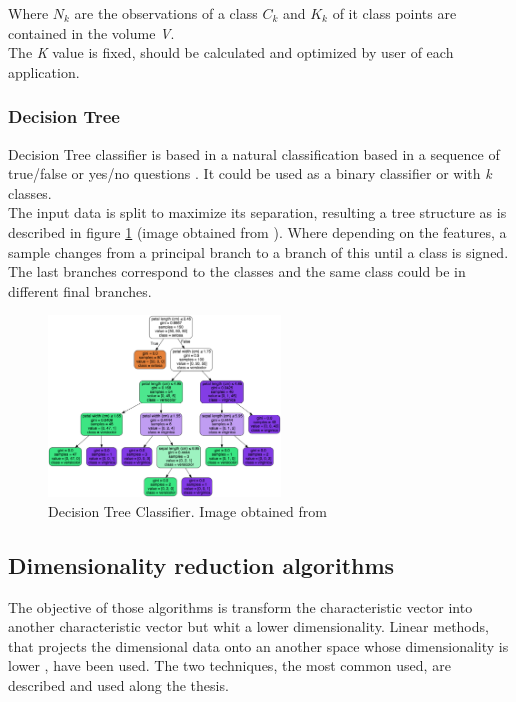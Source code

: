 Where $N_k$ are the observations of a class $C_k$ and $K_k$ of it class points are contained in the volume \textit{V}.\\

The \textit{K} value is fixed, should be calculated and optimized by user of each application.\\

\subsubsection{Decision Tree}
Decision Tree classifier is based in a natural classification based in a sequence of true/false or yes/no questions \cite{Duda}. It could be used as a binary classifier or with \textit{k} classes. \\

The input data is split to maximize its separation, resulting a tree structure \cite{ClassifiersReview} as is described in figure \ref{fig:Tree} (image obtained from \cite{Treeimage}). Where depending on the features, a sample changes from a principal branch to a branch of this until a class is signed. The last branches correspond to the classes and the same class could be in different final branches. \\

\begin{figure}[htb]
\centering
\includegraphics[width=0.55\textwidth]{images_miscelaneus/tree.png}
\caption{Decision Tree Classifier. Image obtained from \cite{Treeimage}} \label{fig:Tree}
\end{figure}

\subsection{Dimensionality reduction algorithms}
The objective of those algorithms is transform the characteristic vector into another characteristic vector but whit a lower dimensionality. Linear methods, that projects the dimensional data onto an another space whose dimensionality is lower \cite{Duda}, have been used. The two techniques, the most common used, are described and used along the thesis.\\


